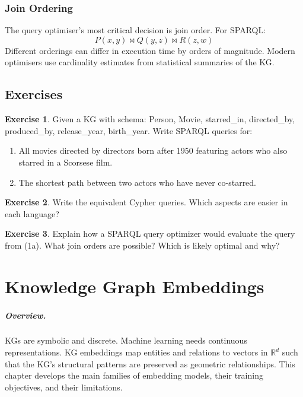 \documentclass[11pt,a4paper,oneside,openany]{book}
\theoremstyle{definition}
\newtheorem{exercise}{Exercise}[chapter]
\theoremstyle{plain}
\theoremstyle{remark}
\newcommand{\R}{\mathbb{R}}
\begin{document}
\subsection{Join Ordering}

The query optimiser's most critical decision is join order. For SPARQL:
$$P(x,y) \bowtie Q(y,z) \bowtie R(z,w)$$
Different orderings can differ in execution time by orders of magnitude. Modern optimisers use cardinality estimates from statistical summaries of the KG.

\section{Exercises}

\begin{exercise}
	Given a KG with schema: Person, Movie, starred\_in, directed\_by, produced\_by, release\_year, birth\_year. Write SPARQL queries for:
	\begin{enumerate}
		\item All movies directed by directors born after 1950 featuring actors who also starred in a Scorsese film.
		\item The shortest path between two actors who have never co-starred.
	\end{enumerate}
\end{exercise}

\begin{exercise}
	Write the equivalent Cypher queries. Which aspects are easier in each language?
\end{exercise}

\begin{exercise}
	Explain how a SPARQL query optimizer would evaluate the query from (1a). What join orders are possible? Which is likely optimal and why?
\end{exercise}

\chapter{Knowledge Graph Embeddings}\label{ch:embeddings}

\paragraph{Overview.}
KGs are symbolic and discrete. Machine learning needs continuous representations. KG embeddings map entities and relations to vectors in $\R^d$ such that the KG's structural patterns are preserved as geometric relationships. This chapter develops the main families of embedding models, their training objectives, and their limitations.
\end{document}
